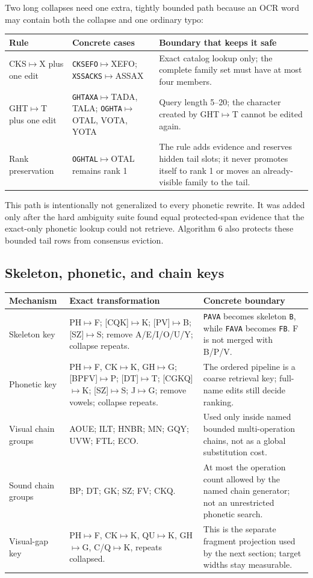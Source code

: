 \documentclass[10pt,a4paper]{article}
\newcommand{\observed}[1]{\texttt{#1}}
\begin{document}
Two long collapses need one extra, tightly bounded path because an OCR word may
contain both the collapse and one ordinary typo:

\begin{tabularx}{\textwidth}{@{}L{28mm}L{39mm}Y@{}}
\toprule
Rule & Concrete cases & Boundary that keeps it safe \\
\midrule
CKS$\mapsto$X plus one edit & \observed{CKSEFO}$\mapsto$XEFO;
\observed{XSSACKS}$\mapsto$ASSAX & Exact catalog lookup only; the complete
family set must have at most four members. \\
GHT$\mapsto$T plus one edit & \observed{GHTAXA}$\mapsto$TADA, TALA;
\newline\observed{OGHTA}$\mapsto$OTAL, VOTA, YOTA & Query length 5--20; the character
created by GHT$\mapsto$T cannot be edited again. \\
Rank preservation & \observed{OGHTAL}$\mapsto$OTAL remains rank 1 & The rule
adds evidence and reserves hidden tail slots; it never promotes itself to rank
1 or moves an already-visible family to the tail. \\
\bottomrule
\end{tabularx}

This path is intentionally not generalized to every phonetic rewrite. It was
added only after the hard ambiguity suite found equal protected-span evidence
that the exact-only phonetic lookup could not retrieve. Algorithm 6 also
protects these bounded tail rows from consensus eviction.

\subsection{Skeleton, phonetic, and chain keys}

\begin{tabularx}{\textwidth}{@{}L{31mm}Y L{49mm}@{}}
\toprule
Mechanism & Exact transformation & Concrete boundary \\
\midrule
Skeleton key & PH$\mapsto$F; [CQK]$\mapsto$K;
[PV]$\mapsto$B; [SZ]$\mapsto$S; remove A/E/I/O/U/Y;
collapse repeats. & \observed{PAVA} becomes skeleton \observed{B}, while
\observed{FAVA} becomes \observed{FB}. F is not merged with B/P/V. \\
Phonetic key & PH$\mapsto$F, CK$\mapsto$K, GH$\mapsto$G;
[BPFV]$\mapsto$P; [DT]$\mapsto$T; [CGKQ]$\mapsto$K;
[SZ]$\mapsto$S; J$\mapsto$G; remove vowels; collapse repeats. & The ordered
pipeline is a coarse retrieval key; full-name edits still decide ranking. \\
Visual chain groups & AOUE; ILT; HNBR; MN; GQY; UVW; FTL; ECO. & Used only
inside named bounded multi-operation chains, not as a global substitution cost. \\
Sound chain groups & BP; DT; GK; SZ; FV; CKQ. & At most the operation count
allowed by the named chain generator; not an unrestricted phonetic search. \\
Visual-gap key & PH$\mapsto$F, CK$\mapsto$K, QU$\mapsto$K,
GH$\mapsto$G, C/Q$\mapsto$K, repeats collapsed. & This is the separate
fragment projection used by the next section; target widths stay measurable. \\
\bottomrule
\end{tabularx}
\end{document}
